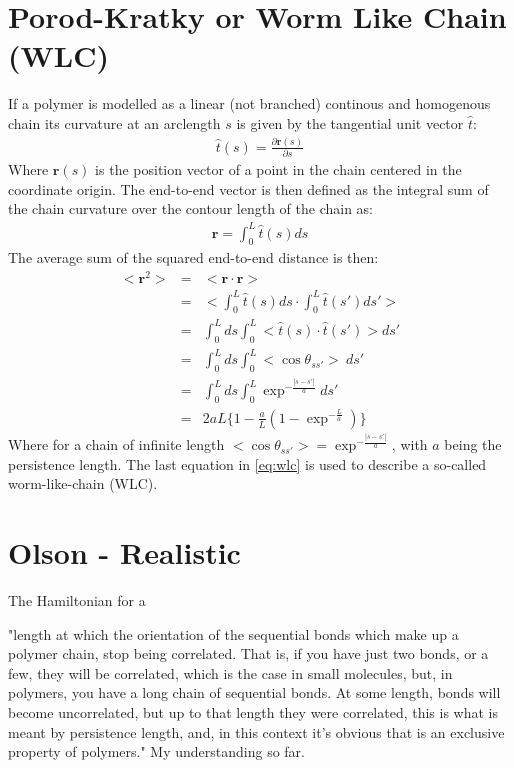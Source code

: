 \section{Porod-Kratky or Worm Like Chain (WLC)}
If a polymer is modelled as a linear (not branched) continous and
homogenous chain its curvature at an arclength $s$ is given by the
tangential unit vector $\hat{t}$:
\begin{gather}
\hat{t}(s)=\frac{\partial{\textbf{r}(s)}}{\partial{s}}
\end{gather}
Where $\textbf{r}(s)$ is the position vector of a point in the chain
centered in the coordinate origin.
The end-to-end vector is then defined as the integral sum of the chain
curvature over the contour length of the chain as:
\begin{gather}
\textbf{r}=\int_{0}^{L}\hat{t}(s)ds
\end{gather}
The average sum of the squared end-to-end distance is then:
\begin{eqnarray}
\label{eq:wlc}
<\textbf{r}^2> & = & <\textbf{r} \cdot \textbf{r}> \nonumber \\
               & = & <\int_{0}^{L}\hat{t}(s)ds \cdot \int_{0}^{L}\hat{t}(s')ds' >\nonumber \\
               & = & \int_{0}^{L} ds \int_{0}^{L}<\hat{t}(s) \cdot \hat{t}(s')>ds' \nonumber \\
               & = & \int_{0}^{L} ds \int_{0}^{L} <\cos{\theta}_{ss'}>~ ds' \nonumber \\
               & = & \int_{0}^{L} ds \int_{0}^{L} \exp^{-\frac{|s-s'|}{a}} ds' \nonumber \\
               & = & 2aL \{ 1 - \frac{a}{L}(1-\exp^{-\frac{L}{a}})\}
\end{eqnarray}
Where  for   a  chain  of  infinite   length  $<\cos{\theta_{ss'}}>  =
\exp^{-\frac{|s-s'|}{a}}$, with $a$ being the persistence length.  The
last   equation  in   \ref{eq:wlc}   is  used   to   describe  a   so-called
worm-like-chain (WLC).

\section{Olson - Realistic}

The Hamiltonian for a \cite{czapla2009}






"length at which the orientation of the sequential bonds which make up
a polymer chain, stop being correlated.  That is, if you have just two
bonds, or a  few, they will be correlated, which is  the case in small
molecules,  but, in  polymers, you  have  a long  chain of  sequential
bonds. At some length, bonds  will become uncorrelated, but up to that
length  they were  correlated, this  is what  is meant  by persistence
length,  and,  in this  context  it's  obvious  that is  an  exclusive
property of polymers." My understanding so far.







